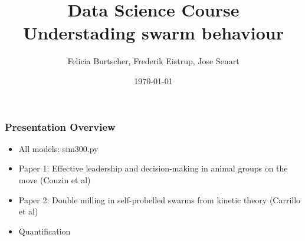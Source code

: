 \documentclass[compress]{beamer}
\title[Short title]{Data Science Course\\
\small{Understading swarm behaviour}}
\author[Grupo B4]{Felicia Burtscher, Frederik Eistrup, Jose Senart\\  %
} %
\date{\today}
\institute[FUB]{\vspace{-10pt}Freie Universität Berlin}
\begin{document}
\begin{frame}
\titlepage
\end{frame}



\begin{frame}
  \frametitle{Presentation Overview}

  \begin{itemize}
  	\item All models: sim300.py
	\item Paper 1: Effective leadership and decision-making in animal groups on the move (Couzin et al)
	\item Paper 2: Double milling in self-probelled swarms from kinetic theory (Carrillo et al)
	\item Quantification
  \end{itemize}


\end{frame}
\end{document}
